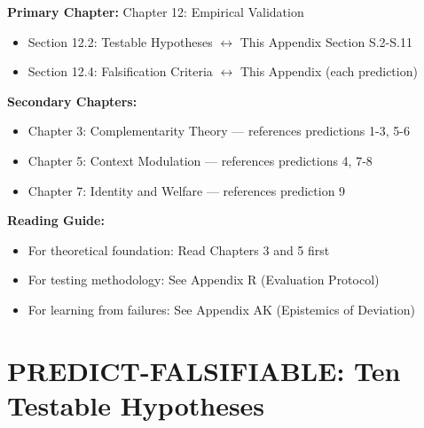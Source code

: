 \begin{tcolorbox}[colback=purple!5!white, colframe=purple!75!black,
    title=Chapter Linkage]

\textbf{Primary Chapter:} Chapter 12: Empirical Validation
\begin{itemize}[nosep]
\item Section 12.2: Testable Hypotheses $\leftrightarrow$ This Appendix Section S.2-S.11
\item Section 12.4: Falsification Criteria $\leftrightarrow$ This Appendix (each prediction)
\end{itemize}

\textbf{Secondary Chapters:}
\begin{itemize}[nosep]
\item Chapter 3: Complementarity Theory --- references predictions 1-3, 5-6
\item Chapter 5: Context Modulation --- references predictions 4, 7-8
\item Chapter 7: Identity and Welfare --- references prediction 9
\end{itemize}

\textbf{Reading Guide:}
\begin{itemize}[nosep]
\item For theoretical foundation: Read Chapters 3 and 5 first
\item For testing methodology: See Appendix R (Evaluation Protocol)
\item For learning from failures: See Appendix AK (Epistemics of Deviation)
\end{itemize}

\end{tcolorbox}


\chapter{PREDICT-FALSIFIABLE: Ten Testable Hypotheses}
\label{app:S-falsifiable}


\begin{abstract}
A framework that can explain everything explains nothing. This appendix addresses the Popperian challenge by deriving ten specific, falsifiable predictions from the EBF $(C, \Psi, C^*, K, Q)$ framework. Each prediction specifies the direction and magnitude of effects, identifies what evidence would refute it, and provides concrete empirical tests. Topics include cash transfer effectiveness, management practice transfer, information intervention asymmetry, financial-political crisis lags, recovery convexity, trade war hysteresis, technology-culture divergence, multi-level coherence conflicts, identity-economics non-substitutability, and coherent traps.
\end{abstract}

